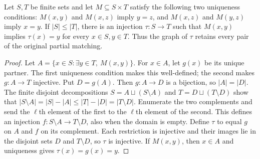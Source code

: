 \begin{lemma}
Let $S,T$ be finite sets and let $M\subseteq S\times T$ satisfy the
following two uniqueness conditions: $M(x,y)$ and $M(x,z)$ imply $y=z$,
and $M(x,z)$ and $M(y,z)$ imply $x=y$.
If $|S|\leq |T|$, there is an injection $\tau:S\to T$ such that
$M(x,y)$ implies $\tau(x)=y$ for every $x\in S,y\in T$.
Thus the graph of $\tau$ retains every pair of the original partial matching.
\end{lemma}
\begin{proof}
Let $A=\{x\in S:\exists y\in T,\ M(x,y)\}$.
For $x\in A$, let $g(x)$ be its unique partner.  The first uniqueness
condition makes this well-defined; the second makes $g:A\to T$ injective.
Put $D=g(A)$.  Then $g:A\to D$ is a bijection, so $|A|=|D|$.
The finite disjoint decompositions $S=A\sqcup(S\setminus A)$ and
$T=D\sqcup(T\setminus D)$ show that
$|S\setminus A|=|S|-|A|\leq |T|-|D|=|T\setminus D|$.
Enumerate the two complements and send the $\ell$th element of the
first to the $\ell$th element of the second.  This defines an injection
$f:S\setminus A\to T\setminus D$, also when the domain is empty.
Define $\tau$ to equal $g$ on $A$ and $f$ on its complement.
Each restriction is injective and their images lie in the disjoint
sets $D$ and $T\setminus D$, so $\tau$ is injective.  If $M(x,y)$,
then $x\in A$ and uniqueness gives $\tau(x)=g(x)=y$.
\end{proof}
